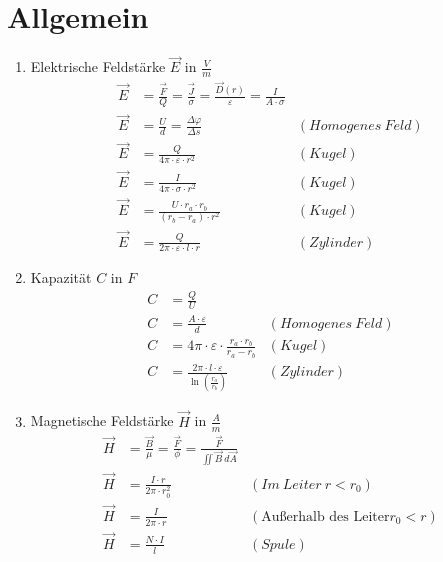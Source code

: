 \section{Allgemein}
\begin{enumerate}
	\item Elektrische Feldstärke $ \vec E $ in $ \frac{V}{m} $
	      \begin{align*}
		      \vec E & = \frac{\vec F}{Q} = \frac{\vec J}{\sigma}
		      = \frac{\vec D(r)}{\varepsilon}=\frac{I}{A\cdot \sigma}                        \\
		      \vec E & = \frac{U}{d}=\frac{\Delta\varphi}{\Delta s}     & (Homogenes \ Feld) \\
		      \vec E & = \frac{Q}{4\pi\cdot\varepsilon\cdot r^2}        & (Kugel)            \\
		      \vec E & = \frac{I}{4\pi\cdot\sigma\cdot r^2}             & (Kugel)            \\
		      \vec E & = \frac{U\cdot r_a\cdot r_b}{(r_b-r_a)\cdot r^2} & (Kugel)            \\
		      \vec E & = \frac{Q}{2\pi\cdot\varepsilon\cdot l\cdot r}   & (Zylinder)
	      \end{align*}

	\item Kapazität $ C $ in $ F $
	      \begin{align*}
		      C & =\frac{Q}{U}                                                                              \\
		      C & =\frac{A\cdot\varepsilon}{d}                                         & (Homogenes \ Feld) \\
		      C & =4\pi\cdot\varepsilon\cdot \frac{r_a\cdot r_b}{r_a-r_b}              & (Kugel)            \\
		      C & =\frac{2\pi\cdot l\cdot\varepsilon}{\ln\left(\frac{r_a}{r_b}\right)} & (Zylinder)
	      \end{align*}
	\item Magnetische Feldstärke $ \vec H $ in $ \frac{A}{m} $
	      \begin{align*}
		      \vec H & =\frac{\vec B}{\mu}
		      =\frac{\vec F}{\phi}=\frac{\vec F}{\iint \vec B\ d\vec A}                         \\
		      \vec H & =\frac{I\cdot r}{2\pi\cdot r_0^2} & (Im\ Leiter \ r<r_0)                 \\
		      \vec H & =\frac{I}{2\pi\cdot r}            & (\text{Außerhalb des  Leiter} r_0<r) \\
		      \vec H & =\frac{N\cdot I}{l}               & (Spule)
	      \end{align*}
\end{enumerate}
